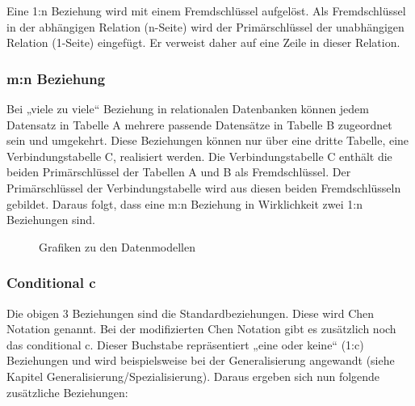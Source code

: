 Eine 1:n Beziehung wird mit einem Fremdschlüssel aufgelöst.
Als Fremdschlüssel in der abhängigen Relation (n-Seite) wird der Primärschlüssel der unabhängigen Relation (1-Seite) eingefügt. Er verweist daher auf eine Zeile in dieser Relation.

 \subsubsection{m:n Beziehung}

 Bei „viele zu viele“ Beziehung in relationalen Datenbanken können jedem Datensatz in Tabelle A mehrere passende Datensätze in Tabelle B zugeordnet sein und umgekehrt. Diese Beziehungen können nur über eine dritte Tabelle, eine Verbindungstabelle C, realisiert werden. Die Verbindungstabelle C enthält die beiden Primärschlüssel der Tabellen A und B als Fremdschlüssel. Der Primärschlüssel der Verbindungstabelle wird aus diesen beiden Fremdschlüsseln gebildet. Daraus folgt, dass eine m:n Beziehung in Wirklichkeit zwei 1:n Beziehungen sind.

 \begin{figure}[H]
    \centering
    \caption{Grafiken zu den Datenmodellen}
    \label{fig:modellierung:models}
\end{figure}

\subsubsection{Conditional c}

Die obigen 3 Beziehungen sind die Standardbeziehungen. Diese wird Chen Notation genannt. Bei der modifizierten Chen Notation gibt es zusätzlich noch das conditional c. Dieser Buchstabe repräsentiert „eine oder keine“ (1:c) Beziehungen und wird beispielsweise bei der Generalisierung angewandt (siehe Kapitel Generalisierung/Spezialisierung). Daraus ergeben sich nun folgende zusätzliche Beziehungen:

